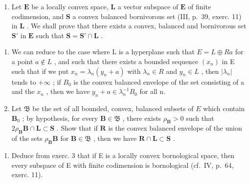 \begin{enumerate}
\def\labelenumi{\arabic{enumi})}
\setcounter{enumi}{2}
\tightlist
\item
  Let \(\mathbf{E}\) be a locally convex space, \(\mathbf{L}\) a vector subspace of \(\mathbf{E}\) of finite codimension, and \(\mathbf{S}\) a convex balanced bornivorous set (III, p.~39, exerc. 11) in \(\mathbf{L}\) . We shall prove that there exists a convex, balanced and bornivorous set \(\mathbf{S}'\) in \(\mathbf{E}\) such that \(\mathbf{S} = \mathbf{S}' \cap \mathbf{L}\) .
\end{enumerate}

\begin{enumerate}
\def\labelenumi{\alph{enumi})}
\item
  We can reduce to the case where L is a hyperplane such that \(E = L \oplus Ra\) for a point \(a \notin L\) , and such that there exists a bounded sequence \((x_{n})\) in E such that if we put \(x_{n} = \lambda_{n}(y_{n} + a)\) with \(\lambda_{n} \in R\) and \(y_{n} \in L\) , then \(|\lambda_{n}|\) tends to \(+\infty\) ; if \(B_{0}\) is the convex balanced envelope of the set consisting of a and the \(x_{n}\) , then we have \(y_{n} + a \in \lambda_{n}^{-1}B_{0}\) for all n.
\item
  Let \(\mathfrak{B}\) be the set of all bounded, convex, balanced subsets of \(E\) which contain \(\mathbf{B}_0\) ; by hypothesis, for every \(\mathbf{B} \in \mathfrak{B}\) , there exists \(\rho_{\mathbf{B}} > 0\) such that \(2\rho_{\mathbf{B}}\mathbf{B} \cap \mathbf{L} \subset \mathbf{S}\) . Show that if \(\mathbf{R}\) is the convex balanced envelope of the union of the sets \(\rho_{\mathbf{B}}\mathbf{B}\) for \(\mathbf{B} \in \mathfrak{B}\) , then we have \(\mathbf{R} \cap \mathbf{L} \subset \mathbf{S}\) .
\end{enumerate}

\begin{enumerate}
\def\labelenumi{\arabic{enumi})}
\setcounter{enumi}{3}
\tightlist
\item
  Deduce from exerc. 3 that if E is a locally convex bornological space, then every subspace of E with finite codimension is bornological (cf.~IV, p.~64, exerc. 11).
\end{enumerate}

